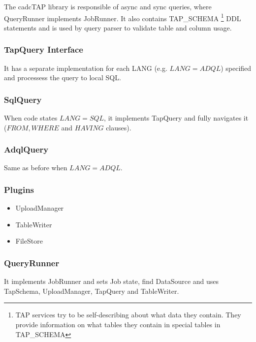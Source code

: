 The cadcTAP library is responsible of async and sync queries, where QueryRunner implements JobRunner. It also contains TAP\_SCHEMA \footnote{TAP services try to be self-describing about what data they contain. They provide information on what tables they contain in special tables in TAP\_SCHEMA} DDL statements and is used by query parser to validate table and column usage.

\subsubsection{TapQuery Interface}

It has a separate implementation for each LANG (e.g. $LANG = ADQL$) specified and processess the query to local SQL.

\subsubsection{SqlQuery}

When code states $LANG=SQL$, it implements TapQuery and fully navigates it ($FROM, WHERE$ and $HAVING$ clauses).

\subsubsection{AdqlQuery}

Same as before when $LANG=ADQL$.

\subsubsection{Plugins}

\begin{itemize}
\item UploadManager
\item TableWriter
\item FileStore
\end{itemize}


\subsubsection{QueryRunner}

It implements JobRunner and sets Job state, find DataSource and uses TapSchema, UploadManager, TapQuery and TableWriter.

